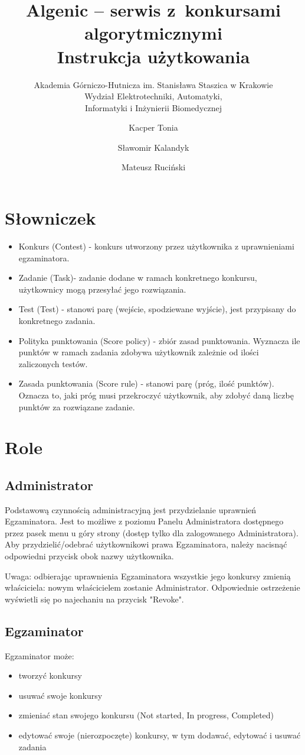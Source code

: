 \documentclass{article}
\title{Algenic -- serwis z~konkursami algorytmicznymi\\
Instrukcja użytkowania}
\subtitle{Akademia Górniczo-Hutnicza im. Stanisława Staszica w Krakowie\\
	Wydział Elektrotechniki, Automatyki,\\
	Informatyki i Inżynierii Biomedycznej}
\author{Kacper Tonia\and
		Sławomir Kalandyk\and
		Mateusz Ruciński}
\date{}
\begin{document}
\maketitle

\section{Słowniczek}
\begin{itemize}
	\item Konkurs (Contest) - konkurs utworzony przez użytkownika z uprawnieniami egzaminatora. 
	\item Zadanie (Task)- zadanie dodane w ramach konkretnego konkursu, użytkownicy mogą przesyłać jego rozwiązania.
	\item Test (Test) - stanowi parę (wejście, spodziewane wyjście), jest przypisany do konkretnego zadania.
	\item Polityka punktowania (Score policy) - zbiór zasad punktowania. Wyznacza ile punktów w ramach zadania zdobywa użytkownik zależnie od ilości zaliczonych testów.
	\item Zasada punktowania (Score rule) - stanowi parę (próg, ilość punktów). Oznacza to, jaki próg musi przekroczyć użytkownik, aby zdobyć daną liczbę punktów za rozwiązane zadanie.
\end{itemize}

\section{Role}
\subsection{Administrator}
Podstawową czynnością administracyjną jest przydzielanie uprawnień Egzaminatora. Jest to możliwe z poziomu Panelu Administratora dostępnego przez pasek menu u góry strony (dostęp tylko dla zalogowanego Administratora). Aby przydzielić/odebrać użytkownikowi prawa Egzaminatora, należy nacisnąć odpowiedni przycisk obok nazwy użytkownika.

Uwaga: odbierając uprawnienia Egzaminatora wszystkie jego konkursy zmienią właściciela: nowym właścicielem zostanie Administrator. Odpowiednie ostrzeżenie wyświetli się po najechaniu na przycisk "Revoke".

\subsection{Egzaminator}
Egzaminator może:
\begin{itemize}
    \item tworzyć konkursy
    \item usuwać swoje konkursy
    \item zmieniać stan swojego konkursu (Not started, In progress, Completed)
    \item edytować swoje (nierozpoczęte) konkursy, w tym dodawać, edytować i usuwać zadania
\end{itemize}
\end{document}
